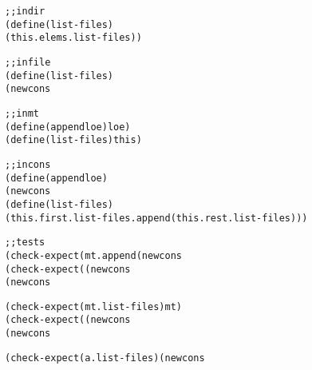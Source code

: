 \documentclass[12pt]{article}                   %
\newenvironment{solution}{\color{Red}}{}
\begin{document}
\begin{problem}
\begin{solution}
\begin{alltt}
;; in dir%
(define (list-files)
  (this . elems . list-files))

;; in file%
(define (list-files)
  (new cons% this (new mt%)))

;; in mt%
(define (append loe) loe)
(define (list-files) this)

;; in cons%
(define (append loe)
  (new cons% (this . first) (this . rest . append loe)))
(define (list-files)
  (this . first . list-files . append (this . rest . list-files)))


;; tests
(check-expect (mt . append (new cons% a mt)) (new cons% a mt))
(check-expect ((new cons% a mt) . append (new cons% b mt))
              (new cons% a (new cons% b mt)))

(check-expect (mt . list-files) mt)
(check-expect ((new cons% a (new cons% b mt)) . list-files)
              (new cons% a (new cons% b mt)))

(check-expect (a . list-files) (new cons% a mt))
\end{alltt}
\end{solution}

\end{problem}
\newpage
\end{document}
